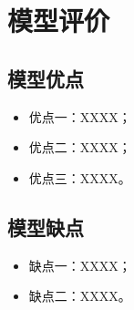 \section{模型评价}

\subsection{模型优点}
\begin{itemize}
    \item 优点一：XXXX；
    \item 优点二：XXXX；
    \item 优点三：XXXX。
\end{itemize}

\subsection{模型缺点}
\begin{itemize}
    \item 缺点一：XXXX；
    \item 缺点二：XXXX。
\end{itemize}
